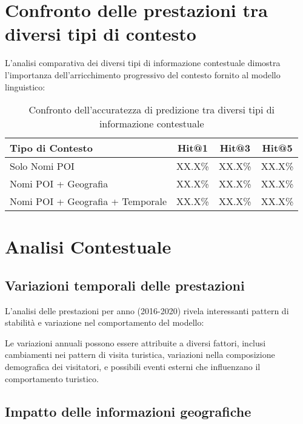 \section{Confronto delle prestazioni tra diversi tipi di contesto}

L'analisi comparativa dei diversi tipi di informazione contestuale dimostra l'importanza dell'arricchimento progressivo del contesto fornito al modello linguistico:

\begin{table}[H]
\centering
\caption{Confronto dell'accuratezza di predizione tra diversi tipi di informazione contestuale}
\label{tab:context_comparison}
\begin{tabular}{@{}lccc@{}}
\toprule
Tipo di Contesto & Hit@1 & Hit@3 & Hit@5 \\
\midrule
Solo Nomi POI & XX.X\% & XX.X\% & XX.X\% \\
Nomi POI + Geografia & XX.X\% & XX.X\% & XX.X\% \\
Nomi POI + Geografia + Temporale & XX.X\% & XX.X\% & XX.X\% \\
\bottomrule
\end{tabular}
\end{table}

\section{Analisi Contestuale}

\subsection{Variazioni temporali delle prestazioni}

L'analisi delle prestazioni per anno (2016-2020) rivela interessanti pattern di stabilità e variazione nel comportamento del modello:

\begin{figure}[H]
\centering
\end{figure}

Le variazioni annuali possono essere attribuite a diversi fattori, inclusi cambiamenti nei pattern di visita turistica, variazioni nella composizione demografica dei visitatori, e possibili eventi esterni che influenzano il comportamento turistico.

\subsection{Impatto delle informazioni geografiche}

